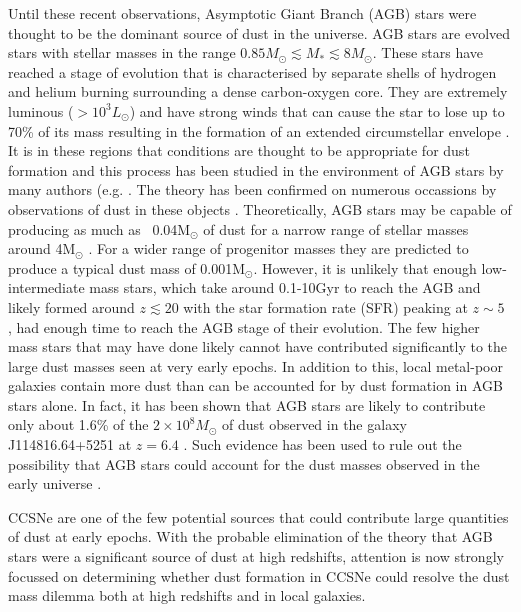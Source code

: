 Until these recent observations, Asymptotic Giant Branch (AGB) stars were thought to be the dominant source of dust in the universe.  AGB stars are evolved stars with stellar masses in the range $0.85M_{\odot} \lesssim M_{*} \lesssim 8M_{\odot}$.  These stars have reached a stage of evolution that is characterised by separate shells of hydrogen and helium burning surrounding a dense carbon-oxygen core. They are extremely luminous ($>10^3L_{\odot}$) and have strong winds that can cause the star to lose up to 70\% of its mass resulting in the formation of an extended circumstellar envelope \citep{Wood2004a}.  It is in these regions that conditions are thought to be appropriate for dust formation and this process has been studied in the environment of AGB stars by many authors (e.g. \citet{Gail1999,Cherchneff2000,Ferrarotti2005}.  The theory has been confirmed on numerous occassions by observations of dust  in these objects \citep{Meixner2006,Matsuura2009,Sloan2009,Boyer2011,Boyer2012,Riebel2012,Matsuura2013}. Theoretically, AGB stars may be capable of producing as much as ~0.04M$_{\odot}$ of dust for a narrow range of stellar masses around 4M$_{\odot}$ \citep{Ferrarotti2006}.  For a wider range of progenitor masses they are predicted to produce a typical dust mass of 0.001M$_{\odot}$. However, it is unlikely that enough low-intermediate mass stars, which take around 0.1-10Gyr to reach the AGB \citep{Salaris2014} and likely formed around $z\lesssim20$ with the star formation rate (SFR) peaking at $z\sim5$ \citep{Greif2006}, had enough time to reach the AGB stage of their evolution.  The few higher mass stars that may have done likely cannot have contributed significantly to the large dust masses seen at very early epochs.  In addition to this, local metal-poor galaxies contain more dust than can be accounted for by dust formation in AGB stars alone.  In fact, it has been shown that AGB stars are likely to contribute only about 1.6\% of the $2\times 10^8M_{\odot}$ of dust observed in the galaxy J114816.64+5251 at $z=6.4$ \citep{Dwek2007,Matsuura2009,Matsuura2013}.  Such evidence has been used to rule out the possibility that AGB stars could account for the dust masses observed in the early universe \citep{Michalowski2015}.

CCSNe are one of the few potential sources that could contribute large quantities of dust at early epochs.  With the probable elimination of the theory that AGB stars were a significant source of dust at high redshifts, attention is now strongly focussed on determining whether dust formation in CCSNe could resolve the dust mass dilemma both at high redshifts and in local galaxies.

